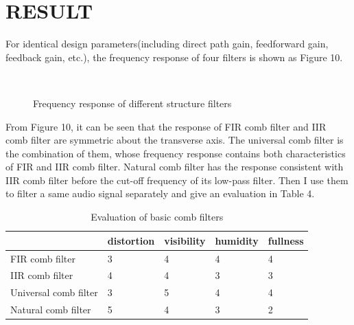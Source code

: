 \documentclass[a4paper]{tufte-handout} %
\begin{document}
\section{RESULT}
For identical design parameters(including direct path gain, feedforward gain, feedback gain, etc.), the frequency response of four filters is shown as Figure 10.
\begin{figure}[h!]
    \centering
    \\
    \caption{Frequency response of different structure filters}
\end{figure}
From Figure 10, it can be seen that the response of FIR comb filter and IIR comb filter are symmetric about the transverse axis. The universal comb filter is the combination of them, whose frequency response contains both characteristics of FIR and IIR comb filter. Natural comb filter has the response consistent with IIR comb filter before the cut-off frequency of its low-pass filter. Then I use them to filter a same audio signal separately and give an evaluation in Table 4.
\begin{table}[ht]
	\centering
	\selectfont
	\begin{tabular}{l l l l l}
		\toprule
		 & distortion & visibility & humidity & fullness \\
		\midrule
		FIR comb filter & 3 & 4 & 4 & 4 \\
		IIR comb filter & 4 & 4 & 3 & 3 \\
		Universal comb filter & 3 & 5 & 4 & 4 \\
		Natural comb filter & 5 & 4 & 3 & 2 \\
		\bottomrule
	\end{tabular}
	\caption{Evaluation of basic comb filters}
	\label{tab:normaltab}
\end{table}
\end{document}
